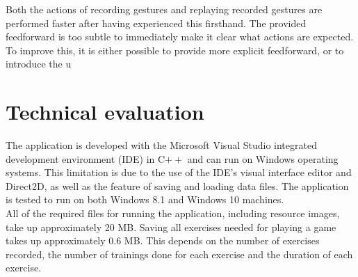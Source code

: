 Both the actions of recording gestures and replaying recorded gestures are performed faster after having experienced this firsthand. The provided feedforward is too subtle to immediately make it clear what actions are expected. To improve this, it is either possible to provide more explicit feedforward, or to introduce the u


\section{Technical evaluation}

The application is developed with the Microsoft Visual Studio integrated development environment (IDE) in C$++$ and can run on Windows operating systems. This limitation is due to the use of the IDE's visual interface editor and Direct2D, as well as the feature of saving and loading data files. The application is tested to run on both Windows 8.1 and Windows 10 machines.\\

All of the required files for running the application, including resource images, take up approximately 20 MB. Saving all exercises needed for playing a game takes up approximately 0.6 MB. This depends on the number of exercises recorded, the number of trainings done for each exercise and the duration of each exercise.\\

